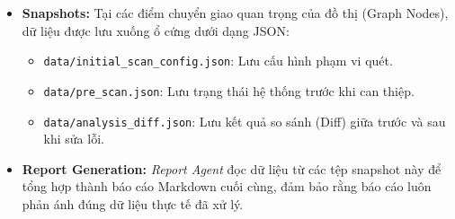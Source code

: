\begin{itemize}
    \item \textbf{Snapshots:} Tại các điểm chuyển giao quan trọng của đồ thị (Graph Nodes), dữ liệu được lưu xuống ổ cứng dưới dạng JSON:
    \begin{itemize}
        \item \texttt{data/initial\_scan\_config.json}: Lưu cấu hình phạm vi quét.
        \item \texttt{data/pre\_scan.json}: Lưu trạng thái hệ thống trước khi can thiệp.
        \item \texttt{data/analysis\_diff.json}: Lưu kết quả so sánh (Diff) giữa trước và sau khi sửa lỗi.
    \end{itemize}
    \item \textbf{Report Generation:} \textit{Report Agent} đọc dữ liệu từ các tệp snapshot này để tổng hợp thành báo cáo Markdown cuối cùng, đảm bảo rằng báo cáo luôn phản ánh đúng dữ liệu thực tế đã xử lý.
\end{itemize}